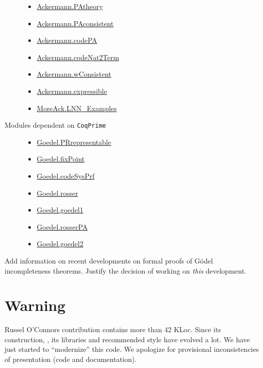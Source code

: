 \begin{description}
\begin{itemize}
\item \href{../theories/html/hydras.Ackermann.PAtheory.html}{Ackermann.PAtheory}
\item \href{../theories/html/hydras.Ackermann.PAconsistent.html}{Ackermann.PAconsistent}

\item \href{../theories/html/hydras.Ackermann.codePA.html}{Ackermann.codePA}

\item \href{../theories/html/hydras.Ackermann.codeNatToTerm.html}{Ackermann.codeNat2Term}
\item \href{../theories/html/hydras.Ackermann.wConsistent.html}{Ackermann.wConsistent}
\item \href{../theories/html/hydras.Ackermann.expressible.html}{Ackermann.expressible}

\item \href{../theories/html/hydras.MoreAck.LNN_Examples.html}{MoreAck.LNN\_Examples}
\end{itemize}

\item[Modules dependent on \texttt{CoqPrime}]

\mbox{}

  \begin{itemize}
  \item \href{../theories/html/Goedel.PRrepresentable.html}{Goedel.PRrepresentable}
 \item \href{../theories/html/Goedel.fixPoint.html}{Goedel.fixPoint}
 \item \href{../theories/html/Goedel.codeSysPrf.html}{Goedel.codeSysPrf}
 \item \href{../theories/html/Goedel.rosser.html}{Goedel.rosser}
 \item \href{../theories/html/Goedel.goedel1.html}{Goedel.goedel1}
 \item \href{../theories/html/Goedel.rosserPA.html}{Goedel.rosserPA}
 \item \href{../theories/html/Goedel.goedel2.html}{Goedel.goedel2}
  \end{itemize}
\end{description}

\begin{todo}
Add information on recent developments on formal 
proofs of G\"odel  incompleteness theorems. Justify the decision of working on \emph{this} development.  
\end{todo}

\section{Warning}
Russel O'Connors contribution contains more than 42 KLoc.
Since its construction, \coq{},  its libraries and recommended style have evolved a lot. We have just started to ``modernize'' this code. We apologize for provisional inconsistencies of presentation (code and documentation).
